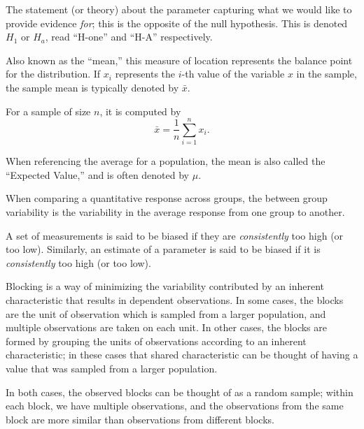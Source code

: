\documentclass[
  letterpaper,
  DIV=11,
  numbers=noendperiod]{scrreprt}
\providecommand{\tightlist}{%
  \setlength{\itemsep}{0pt}\setlength{\parskip}{0pt}}\usepackage{longtable,booktabs,array}
\theoremstyle{definition}
\theoremstyle{definition}
\theoremstyle{plain}
\theoremstyle{remark}
\begin{document}
\begin{description}
\tightlist
\item[Alternative Hypothesis
(Definition~\ref{def-alternative-hypothesis})]
The statement (or theory) about the parameter capturing what we would
like to provide evidence \emph{for}; this is the opposite of the null
hypothesis. This is denoted \(H_1\) or \(H_a\), read ``H-one'' and
``H-A'' respectively.
\item[Average (Definition~\ref{def-average})]
Also known as the ``mean,'' this measure of location represents the
balance point for the distribution. If \(x_i\) represents the \(i\)-th
value of the variable \(x\) in the sample, the sample mean is typically
denoted by \(\bar{x}\).
\end{description}

For a sample of size \(n\), it is computed by
\[\bar{x} = \frac{1}{n}\sum_{i=1}^{n} x_i.\]

When referencing the average for a population, the mean is also called
the ``Expected Value,'' and is often denoted by \(\mu\).

\begin{description}
\tightlist
\item[Between Group Variability
(Definition~\ref{def-between-group-variability})]
When comparing a quantitative response across groups, the between group
variability is the variability in the average response from one group to
another.
\item[Bias (Definition~\ref{def-bias})]
A set of measurements is said to be biased if they are
\emph{consistently} too high (or too low). Similarly, an estimate of a
parameter is said to be biased if it is \emph{consistently} too high (or
too low).
\item[Blocking (Definition~\ref{def-blocking})]
Blocking is a way of minimizing the variability contributed by an
inherent characteristic that results in dependent observations. In some
cases, the blocks are the unit of observation which is sampled from a
larger population, and multiple observations are taken on each unit. In
other cases, the blocks are formed by grouping the units of observations
according to an inherent characteristic; in these cases that shared
characteristic can be thought of having a value that was sampled from a
larger population.
\end{description}

In both cases, the observed blocks can be thought of as a random sample;
within each block, we have multiple observations, and the observations
from the same block are more similar than observations from different
blocks.
\end{document}

